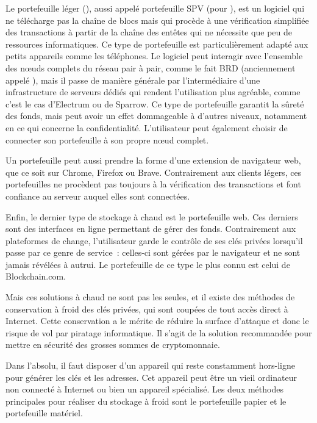 Le portefeuille léger (), aussi appelé portefeuille SPV (pour ), est un logiciel qui ne télécharge pas la chaîne de blocs mais qui procède à une vérification simplifiée des transactions à partir de la chaîne des entêtes qui ne nécessite que peu de ressources informatiques. Ce type de portefeuille est particulièrement adapté aux petits appareils comme les téléphones. Le logiciel peut interagir avec l'ensemble des nœuds complets du réseau pair à pair, comme le fait BRD (anciennement appelé ), mais il passe de manière générale par l'intermédiaire d'une infrastructure de serveurs dédiés qui rendent l'utilisation plus agréable, comme c'est le cas d'Electrum ou de Sparrow. Ce type de portefeuille garantit la sûreté des fonds, mais peut avoir un effet dommageable à d'autres niveaux, notamment en ce qui concerne la confidentialité. L'utilisateur peut également choisir de connecter son portefeuille à son propre nœud complet.

Un portefeuille peut aussi prendre la forme d'une extension de navigateur web, que ce soit sur Chrome, Firefox ou Brave. Contrairement aux clients légers, ces portefeuilles ne procèdent pas toujours à la vérification des transactions et font confiance au serveur auquel elles sont connectées.

Enfin, le dernier type de stockage à chaud est le portefeuille web. Ces derniers sont des interfaces en ligne permettant de gérer des fonds. Contrairement aux plateformes de change, l'utilisateur garde le contrôle de ses clés privées lorsqu'il passe par ce genre de service~: celles-ci sont gérées par le navigateur et ne sont jamais révélées à autrui. Le portefeuille de ce type le plus connu est celui de Blockchain.com.


Mais ces solutions à chaud ne sont pas les seules, et il existe des méthodes de conservation à froid des clés privées, qui sont coupées de tout accès direct à Internet. Cette conservation a le mérite de réduire la surface d'attaque et donc le risque de vol par piratage informatique. Il s'agit de la solution recommandée pour mettre en sécurité des grosses sommes de cryptomonnaie.

Dans l'absolu, il faut disposer d'un appareil qui reste constamment hors-ligne pour générer les clés et les adresses. Cet appareil peut être un vieil ordinateur non connecté à Internet ou bien un appareil spécialisé. Les deux méthodes principales pour réaliser du stockage à froid sont le portefeuille papier et le portefeuille matériel.

